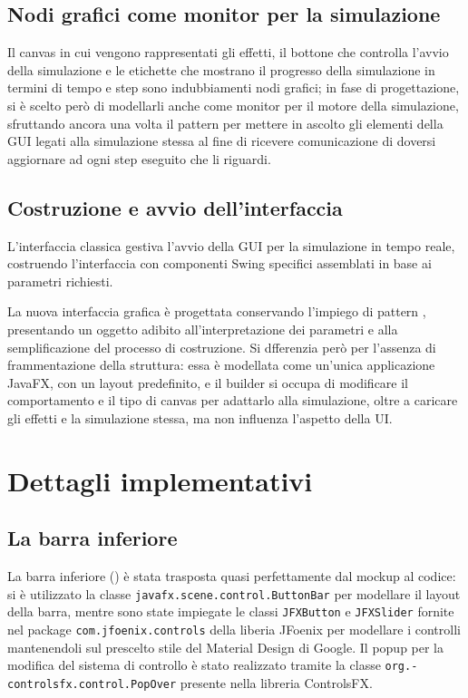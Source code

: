         \subsection{Nodi grafici come monitor per la simulazione}
            Il canvas in cui vengono rappresentati gli effetti, il bottone che controlla l'avvio della simulazione e le etichette che mostrano il progresso della simulazione in termini di tempo e step sono indubbiamenti nodi grafici; in fase di progettazione, si è scelto però di modellarli anche come monitor per il motore della simulazione, sfruttando ancora una volta il pattern  per mettere in ascolto gli elementi della GUI legati alla simulazione stessa al fine di ricevere comunicazione di doversi aggiornare ad ogni step eseguito che li riguardi.

        \subsection{Costruzione e avvio dell'interfaccia}\label{sub:avvio}
            L'interfaccia classica gestiva l'avvio della GUI per la simulazione in tempo reale, costruendo l'interfaccia con componenti Swing specifici assemblati in base ai parametri richiesti.

            La nuova interfaccia grafica è progettata conservando l'impiego di pattern , presentando un oggetto adibito all'interpretazione dei parametri e alla semplificazione del processo di costruzione.
            Si dfferenzia però per l'assenza di frammentazione della struttura: essa è modellata come un'unica applicazione JavaFX, con un layout predefinito, e il builder si occupa di modificare il comportamento e il tipo di canvas per adattarlo alla simulazione, oltre a caricare gli effetti e la simulazione stessa, ma non influenza l'aspetto della UI.

    \section{Dettagli implementativi}\label{sec:dettagli}

        \subsection{La barra inferiore}\label{sub:barra}
            La barra inferiore () è stata trasposta quasi perfettamente dal mockup al codice: si è utilizzato la classe \texttt{javafx\dothyp scene\dothyp control\dothyp ButtonBar} per modellare il layout della barra, mentre sono state impiegate le classi \texttt{JFXButton} e \texttt{JFXSlider} fornite nel package \texttt{com\dothyp jfoenix\dothyp controls} della liberia JFoenix per modellare i controlli mantenendoli sul prescelto stile del Material Design di Google.
            Il popup per la modifica del sistema di controllo è stato realizzato tramite la classe \texttt{org\dothyp controlsfx\dothyp control\dothyp PopOver} presente nella libreria ControlsFX.

